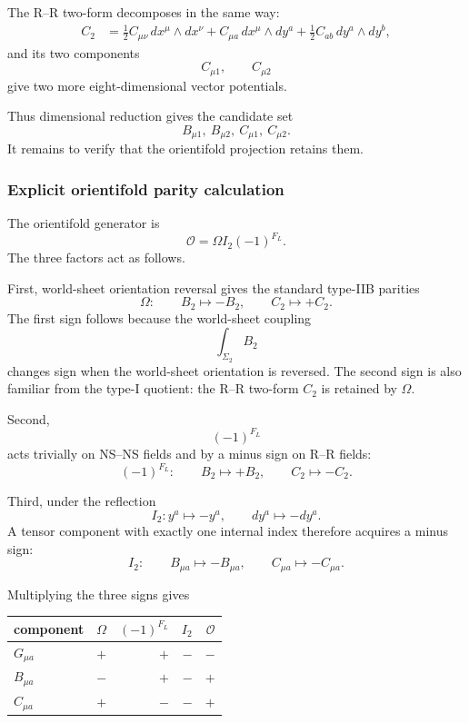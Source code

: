 \documentclass[
  10pt,
  a4paper,
  openany]{book}
\begin{document}
The R--R two-form decomposes in the same way: \[
\begin{aligned}
C_2
&=\frac12C_{\mu\nu}\,dx^\mu\wedge dx^\nu
+C_{\mu a}\,dx^\mu\wedge dy^a
+\frac12C_{ab}\,dy^a\wedge dy^b,
\end{aligned}
\] and its two components \[
C_{\mu1},
\qquad
C_{\mu2}
\] give two more eight-dimensional vector potentials.

Thus dimensional reduction gives the candidate set \[
\boxed{
B_{\mu1},\ B_{\mu2},\
C_{\mu1},\ C_{\mu2}
}.
\] It remains to verify that the orientifold projection retains them.

\subsubsection{Explicit orientifold parity
calculation}\label{explicit-orientifold-parity-calculation}

The orientifold generator is \[
\mathcal O=\Omega I_2(-1)^{F_L}.
\] The three factors act as follows.

First, world-sheet orientation reversal gives the standard type-IIB
parities \[
\Omega:
\qquad
B_2\longmapsto-B_2,
\qquad
C_2\longmapsto+C_2.
\] The first sign follows because the world-sheet coupling \[
\int_{\Sigma_2}B_2
\] changes sign when the world-sheet orientation is reversed. The second
sign is also familiar from the type-I quotient: the R--R two-form
\(C_2\) is retained by \(\Omega\).

Second, \[
(-1)^{F_L}
\] acts trivially on NS--NS fields and by a minus sign on R--R fields:
\[
(-1)^{F_L}:
\qquad
B_2\longmapsto+B_2,
\qquad
C_2\longmapsto-C_2.
\]

Third, under the reflection \[
I_2:y^a\longmapsto-y^a,
\qquad
dy^a\longmapsto-dy^a.
\] A tensor component with exactly one internal index therefore acquires
a minus sign: \[
I_2:
\qquad
B_{\mu a}\longmapsto-B_{\mu a},
\qquad
C_{\mu a}\longmapsto-C_{\mu a}.
\]

Multiplying the three signs gives

\begin{longtable}[]{@{}lrrrr@{}}
\toprule\noalign{}
component & \(\Omega\) & \((-1)^{F_L}\) & \(I_2\) & \(\mathcal O\) \\
\midrule\noalign{}
\endhead
\bottomrule\noalign{}
\endlastfoot
\(G_{\mu a}\) & \(+\) & \(+\) & \(-\) & \(-\) \\
\(B_{\mu a}\) & \(-\) & \(+\) & \(-\) & \(+\) \\
\(C_{\mu a}\) & \(+\) & \(-\) & \(-\) & \(+\) \\
\end{longtable}
\end{document}

